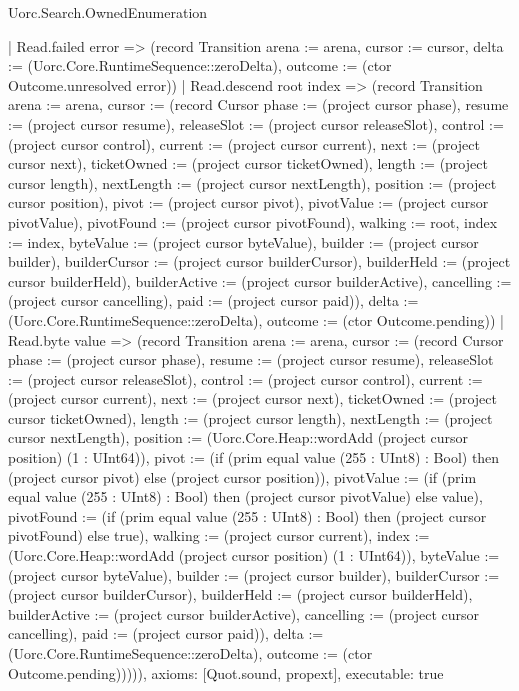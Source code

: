 \begin{lexlean}{Uorc.Search.OwnedEnumeration}
\begin{semanticmodule}
{    | Read.failed error => (record Transition {arena := arena, cursor := cursor, delta := (Uorc.Core.RuntimeSequence::zeroDelta), outcome := (ctor Outcome.unresolved error)})
    | Read.descend root index => (record Transition {arena := arena, cursor := (record Cursor {phase := (project cursor phase), resume := (project cursor resume), releaseSlot := (project cursor releaseSlot), control := (project cursor control), current := (project cursor current), next := (project cursor next), ticketOwned := (project cursor ticketOwned), length := (project cursor length), nextLength := (project cursor nextLength), position := (project cursor position), pivot := (project cursor pivot), pivotValue := (project cursor pivotValue), pivotFound := (project cursor pivotFound), walking := root, index := index, byteValue := (project cursor byteValue), builder := (project cursor builder), builderCursor := (project cursor builderCursor), builderHeld := (project cursor builderHeld), builderActive := (project cursor builderActive), cancelling := (project cursor cancelling), paid := (project cursor paid)}), delta := (Uorc.Core.RuntimeSequence::zeroDelta), outcome := (ctor Outcome.pending)})
    | Read.byte value => (record Transition {arena := arena, cursor := (record Cursor {phase := (project cursor phase), resume := (project cursor resume), releaseSlot := (project cursor releaseSlot), control := (project cursor control), current := (project cursor current), next := (project cursor next), ticketOwned := (project cursor ticketOwned), length := (project cursor length), nextLength := (project cursor nextLength), position := (Uorc.Core.Heap::wordAdd (project cursor position) (1 : UInt64)), pivot := (if (prim equal value (255 : UInt8) : Bool) then (project cursor pivot) else (project cursor position)), pivotValue := (if (prim equal value (255 : UInt8) : Bool) then (project cursor pivotValue) else value), pivotFound := (if (prim equal value (255 : UInt8) : Bool) then (project cursor pivotFound) else true), walking := (project cursor current), index := (Uorc.Core.Heap::wordAdd (project cursor position) (1 : UInt64)), byteValue := (project cursor byteValue), builder := (project cursor builder), builderCursor := (project cursor builderCursor), builderHeld := (project cursor builderHeld), builderActive := (project cursor builderActive), cancelling := (project cursor cancelling), paid := (project cursor paid)}), delta := (Uorc.Core.RuntimeSequence::zeroDelta), outcome := (ctor Outcome.pending)})))),
  axioms: [Quot.sound, propext],
  executable: true
}


\end{semanticmodule}
\end{lexlean}
